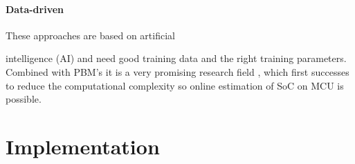 \subsubsection{Data-driven}
\label{section:Data-driven}

These approaches are based on artificial

intelligence (AI) and need good training data and the right training parameters. Combined with PBM's it is a very promising research field \cite{9477587}, which first successes to reduce the computational complexity so online estimation of SoC on MCU is	 possible.





\chapter{Implementation}
\label{chap:Implementation}


